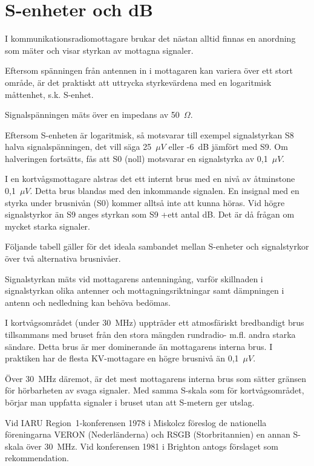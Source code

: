\chapter{S-enheter och dB}
\label{s-enhet}

I kommunikationsradiomottagare brukar det nästan alltid finnas en
anordning som mäter och visar styrkan av mottagna signaler.

Eftersom spänningen från antennen in i mottagaren kan variera över ett stort
område, är det praktiskt att uttrycka styrkevärdena med en logaritmisk
måttenhet, s.k. S-enhet.

Signalspänningen mäts över en impedans av 50~\(\Omega\).

Eftersom S-enheten är logaritmisk, så motsvarar till exempel signalstyrkan
S8 halva signalspänningen, det vill säga 25~\(\mu V\) eller -6~dB jämfört med S9.
Om halveringen fortsätts, fås att S0 (noll) motsvarar en signalstyrka av 0,1~\(\mu V\).

I en kortvågsmottagare alstras det ett internt brus med en nivå av
åtminstone 0,1~\(\mu V\).
Detta brus blandas med den inkommande signalen.
En insignal med en styrka under brusnivån (S0) kommer alltså inte att
kunna höras.
Vid högre signalstyrkor än S9 anges styrkan som S9 +ett antal dB.
Det är då frågan om mycket starka signaler.

Följande tabell gäller för det ideala sambandet mellan S-enheter och
signalstyrkor över två alternativa brusnivåer.

Signalstyrkan mäts vid mottagarens antenningång, varför skillnaden i
signalstyrkan olika antenner och mottagningsriktningar samt dämpningen
i antenn och nedledning kan behöva bedömas.

I kortvågsområdet (under 30~MHz) uppträder ett atmosfäriskt bredbandigt brus
tillsammans med bruset från den stora mängden rundradio- m.fl. andra starka
sändare.
Detta brus är mer dominerande än mottagarens interna brus.
I praktiken har de flesta KV-mottagare en högre brusnivå än 0,1~\(\mu V\).

Över 30~MHz däremot, är det mest mottagarens interna brus som sätter
gränsen för hörbarheten av svaga signaler.
Med samma S-skala som för kortvågsområdet, börjar man uppfatta signaler i
bruset utan att S-metern ger utslag.

Vid IARU Region~1-konferensen 1978 i Miskolcz föreslog de nationella
föreningarna VERON (Nederländerna) och RSGB (Storbritannien) en annan
S-skala över 30~MHz.
Vid konferensen 1981 i Brighton antogs förslaget som rekommendation.

